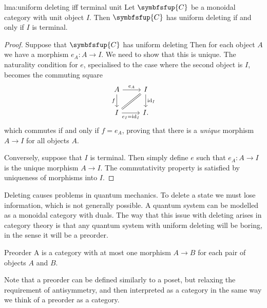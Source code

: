 \documentclass[fleqn]{NotesClass}
\newcommand{\cat}[1]{\symbfsfup{#1}}
\DeclareMathOperator{\id}{id}
\begin{document}
    \begin{lma}{}{lma:uniform deleting iff terminal unit}
        Let \(\cat{C}\) be a monoidal category with unit object \(I\).
        Then \(\cat{C}\) has uniform deleting if and only if \(I\) is terminal.
        \begin{proof}
            Suppose that \(\cat{C}\) has uniform deleting
            Then for each object \(A\) we have a morphism \(e_A \colon A \to I\).
            We need to show that this is unique.
            The naturality condition for \(e\), specialised to the case where the second object is \(I\), becomes the commuting square
            \begin{equation}
                \begin{tikzcd}
                    A \arrow[r, "e_A"] \arrow[d, "f"'] & I \arrow[d, "\id_I"]\\
                    I \arrow[r, "e_I = \id_I"'] \arrow[ur, equal] & I.
                \end{tikzcd}
            \end{equation}
            which commutes if and only if \(f = e_A\), proving that there is a \emph{unique} morphism \(A \to I\) for all objects \(A\).
            
            Conversely, suppose that \(I\) is terminal.
            Then simply define \(e\) such that \(e_A \colon A \to I\) is the unique morphism \(A \to I\).
            The commutativity property is satisfied by uniqueness of morphisms into \(I\).
        \end{proof}
    \end{lma}
    
    Deleting causes problems in quantum mechanics.
    To delete a state we must lose information, which is not generally possible.
    A quantum system can be modelled as a monoidal category with duals.
    The way that this issue with deleting arises in category theory is that any quantum system with uniform deleting will be boring, in the sense it will be a preorder.
    
    \begin{dfn}{Preorder}{}
        A  is a category with at most one morphism \(A \to B\) for each pair of objects \(A\) and \(B\).
    \end{dfn}
    
    Note that a preorder can be defined similarly to a poset, but relaxing the requirement of antisymmetry, and then interpreted as a category in the same way we think of a preorder as a category.
    
\end{document}
